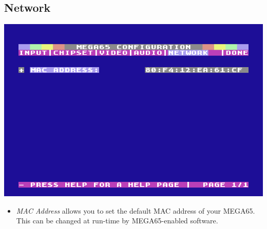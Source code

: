 \subsection{Network}

\includegraphics[width=\linewidth]{images/ss-m65config-5.png}

\begin{itemize}
  \item{\em MAC Address} allows you to set the default MAC address of your MEGA65. This can be changed at run-time by MEGA65-enabled software.
\end{itemize}

